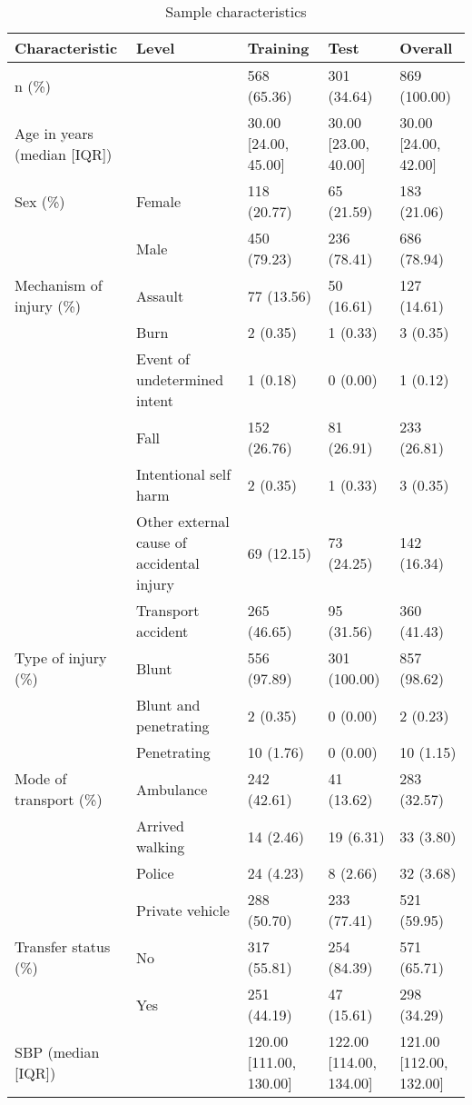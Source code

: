 \documentclass[10pt,letterpaper]{article}\usepackage[]{graphicx}\usepackage[]{color}
\begin{document}
\begin{table}[ht]
\centering
\caption{Sample characteristics} 
\begin{adjustbox}{max width=\textwidth} 
\begin{tabular} 
{lllll}
  \hline
Characteristic & Level & Training & Test & Overall \\ 
  \hline
n (\%) &  & 568 (65.36) & 301 (34.64) & 869 (100.00) \\ 
  Age in years (median [IQR]) &  & 30.00 [24.00, 45.00] & 30.00 [23.00, 40.00] & 30.00 [24.00, 42.00] \\ 
  Sex (\%) & Female & 118 (20.77) & 65 (21.59) & 183 (21.06) \\ 
   & Male & 450 (79.23) & 236 (78.41) & 686 (78.94) \\ 
  Mechanism of injury (\%) & Assault & 77 (13.56) & 50 (16.61) & 127 (14.61) \\ 
   & Burn & 2 (0.35) & 1 (0.33) & 3 (0.35) \\ 
   & Event of undetermined intent & 1 (0.18) & 0 (0.00) & 1 (0.12) \\ 
   & Fall & 152 (26.76) & 81 (26.91) & 233 (26.81) \\ 
   & Intentional self harm & 2 (0.35) & 1 (0.33) & 3 (0.35) \\ 
   & Other external cause of accidental injury & 69 (12.15) & 73 (24.25) & 142 (16.34) \\ 
   & Transport accident & 265 (46.65) & 95 (31.56) & 360 (41.43) \\ 
  Type of injury (\%) & Blunt & 556 (97.89) & 301 (100.00) & 857 (98.62) \\ 
   & Blunt and penetrating & 2 (0.35) & 0 (0.00) & 2 (0.23) \\ 
   & Penetrating & 10 (1.76) & 0 (0.00) & 10 (1.15) \\ 
  Mode of transport (\%) & Ambulance & 242 (42.61) & 41 (13.62) & 283 (32.57) \\ 
   & Arrived walking & 14 (2.46) & 19 (6.31) & 33 (3.80) \\ 
   & Police & 24 (4.23) & 8 (2.66) & 32 (3.68) \\ 
   & Private vehicle & 288 (50.70) & 233 (77.41) & 521 (59.95) \\ 
  Transfer status (\%) & No & 317 (55.81) & 254 (84.39) & 571 (65.71) \\ 
   & Yes & 251 (44.19) & 47 (15.61) & 298 (34.29) \\ 
  SBP (median [IQR]) &  & 120.00 [111.00, 130.00] & 122.00 [114.00, 134.00] & 121.00 [112.00, 132.00] \\ 

\end{tabular}
\end{adjustbox}
\end{table}
\end{document}
